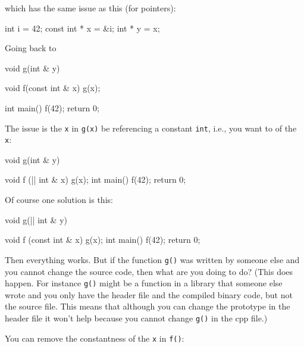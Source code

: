 which has the same issue as this (for pointers):

\begin{console}
int i = 42;
const int * x = &i;
int * y = x;
\end{console}

Going back to

\begin{console}
void g(int & y)
{}

void f(const int & x)
{    
     g(x);
}

int main()
{   
    f(42);
    return 0;
}
\end{console}

The issue is the \texttt{x} in \texttt{g(x)}  be referencing a constant \texttt{int}, i.e., you want to  of the \texttt{x}:

\begin{consolethree}[escapeinside=||]
void g(int & y)
{}

void f (|| int & x)
{    
     g(x);
}
int main()
{   
    f(42);
    return 0;
}
\end{consolethree}

Of course one solution is this:
\begin{consolethree}[escapeinside=||]
void g(|| int & y)
{}

void f (const int & x)
{    
     g(x);
}
int main()
{   
    f(42);
    return 0;
}
\end{consolethree}
Then everything works. But if the function \texttt{g()} was written by someone else and you cannot change the source code, then what are you doing to do? (This does happen. For instance \texttt{g()} might be a function in a library that someone else wrote and you only have the header file and the compiled binary code, but not the source file. This means that although you can change the prototype in the header file it won't help because you cannot change \texttt{g()} in the cpp file.)

You can remove the constantness of the \texttt{x} in \texttt{f()}:

